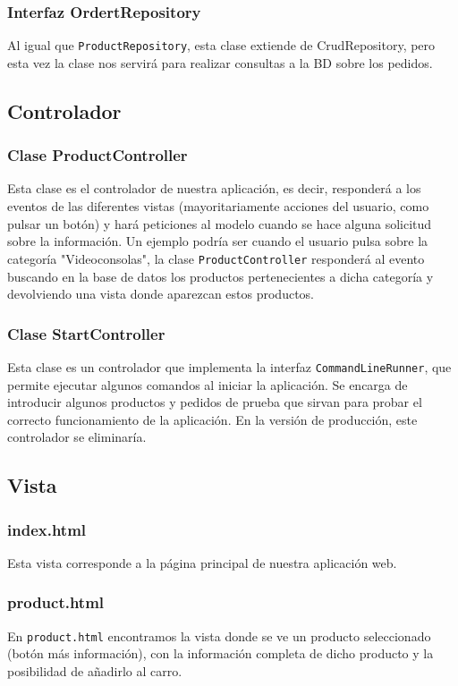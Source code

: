 \documentclass[12pt,a4paper,svgnames]{article}
\begin{document}
\subsubsection{Interfaz OrdertRepository}
Al igual que \texttt{ProductRepository}, esta clase extiende de CrudRepository, pero esta vez la clase nos servirá para realizar consultas a la BD sobre los pedidos.\\
\subsection{Controlador}
\subsubsection{Clase ProductController}
Esta clase es el controlador de nuestra aplicación, es decir, responderá a los eventos de las diferentes vistas (mayoritariamente acciones del usuario, como pulsar un botón) y hará peticiones al modelo cuando se hace alguna solicitud sobre la información.
Un ejemplo podría ser cuando el usuario pulsa sobre la categoría "Videoconsolas", la clase \texttt{ProductController} responderá al evento buscando en la base de datos los productos pertenecientes a dicha categoría y devolviendo una vista donde aparezcan estos productos.\\
\subsubsection{Clase StartController}
Esta clase es un controlador que implementa la interfaz \texttt{CommandLineRunner}, que permite ejecutar algunos comandos al iniciar la aplicación. Se encarga de introducir algunos productos y pedidos de prueba que sirvan para probar el correcto funcionamiento de la aplicación. En la versión de producción, este controlador se eliminaría.
\subsection{Vista}
\subsubsection{index.html}
Esta vista corresponde a la página principal de nuestra aplicación web.
\subsubsection{product.html}
En \texttt{product.html} encontramos la vista donde se ve un producto seleccionado (botón más información), con la información completa de dicho producto y la posibilidad de añadirlo al carro.
\end{document}
